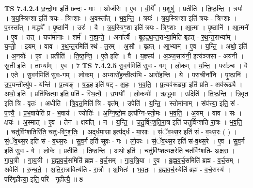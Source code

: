 \documentclass[17pt]{extarticle}
\begin{document}
                  \newline
                                \textbf{ TS 7.4.2.4} \newline
                  छ॒न्दो॒मा इति॑ छन्दः - माः । ओज॑सि । ए॒व । वी॒र्ये᳚ । प॒शुषु॑ । प्रतीति॑ । ति॒ष्ठ॒न्ति॒ । त्रयः॑ । त्र॒य॒स्त्रिꣳ॒॒शा इति॑ त्रयः - त्रिꣳ॒॒शाः । अ॒वस्ता᳚त् । भ॒व॒न्ति॒ । त्रयः॑ । त्र॒य॒स्त्रिꣳ॒॒शा इति॑ त्रयः - त्रिꣳ॒॒शाः । प॒रस्ता᳚त् । मद्ध्ये᳚ । पृ॒ष्ठानि॑ । उरः॑ । वै । त्र॒य॒स्त्रिꣳ॒॒शा इति॑ त्रयः - त्रिꣳ॒॒शाः । आ॒त्मा । पृ॒ष्ठानि॑ । आ॒त्मने᳚ । ए॒व । तत् । यज॑मानाः । शर्म॑ । न॒ह्य॒न्ते॒ । अना᳚र्त्यै । बृ॒ह॒द्र॒थ॒न्त॒राभ्या॒मिति॑ बृहत् - र॒थ॒न्त॒राभ्या᳚म् । य॒न्ती॒ । इ॒यम् । वाव । र॒थ॒न्त॒रमिति॑ रथं - त॒रम् । अ॒सौ । बृ॒हत् । आ॒भ्याम् । ए॒व । य॒न्ति॒ । अथो॒ इति॑ । अ॒नयोः᳚ । ए॒व । प्रतीति॑ । ति॒ष्ठ॒न्ति॒ । ए॒ते इति॑ । वै । य॒ज्ञ्स्य॑ । अ॒ञ्ज॒साय॑नी॒ इत्य॑ञ्जसा - अय॑नी । स्रु॒ती इति॑ । ताभ्या᳚म् । ए॒व । \textbf{  7} \newline
                  \newline
                                \textbf{ TS 7.4.2.5} \newline
                  सु॒व॒र्गमिति॑ सुवः - गम् । लो॒कम् । य॒न्ति॒ । परा᳚ञ्चः । वै । ए॒ते । सु॒व॒र्गमिति॑ सुवः-गम् । लो॒कम् । अ॒भ्यारो॑ह॒न्तीत्य॑भि - आरो॑हन्ति । ये । प॒रा॒चीना॑नि । पृ॒ष्ठानि॑ । उ॒प॒यन्तीत्यु॑प - यन्ति॑ । प्र॒त्यङ् । ष॒ड॒ह इति॑ षट् - अ॒हः । भ॒व॒ति॒ । प्र॒त्यव॑रूढ्या॒ इति॑ प्रति - अव॑रूढ्यै । अथो॒ इति॑ । प्रति॑ष्ठित्या॒ इति॒ प्रति॑ - स्थि॒त्यै॒ । उ॒भयोः᳚ । लो॒कयोः᳚ । ऋ॒द्ध्वा । उदिति॑ । ति॒ष्ठ॒न्ति॒ । त्रि॒वृत॒ इति॑ त्रि - वृतः॑ । अधीति॑ । त्रि॒वृत॒मिति॑ त्रि - वृत᳚म् । उपेति॑ । य॒न्ति॒ । स्तोमा॑नाम् । संप॑त्त्या॒ इति॒ सं - प॒त्त्यै॒ । प्र॒भ॒वायेति॑ प्र - भ॒वाय॑ । ज्योतिः॑ । अ॒ग्नि॒ष्टो॒म इत्य॑ग्नि-स्तो॒मः । भ॒व॒ति॒ । अ॒यम् । वाव । सः । क्षयः॑ । अ॒स्मात् । ए॒व । तेन॑ । क्षया᳚त् । न । य॒न्ति॒ । च॒तु॒र्विꣳ॒॒श॒ति॒रा॒त्र इति॑ चतुर्विꣳशति-रा॒त्रः । भ॒व॒ति॒ । चतु॑र्विꣳशति॒रिति॒ चतुः॑-विꣳ॒॒श॒तिः॒ । अ॒द्‌र्ध॒मा॒सा इत्य॑द्‌र्ध - मा॒साः । सं॒ॅव॒थ्स॒र इति॑ सं - व॒थ्स॒रः ( ) । सं॒ॅव॒थ्स॒र इति॑ सं - व॒थ्स॒रः । सु॒व॒र्ग इति॑ सुवः - गः । लो॒कः । सं॒ॅव॒थ्स॒र इति॑ सं-व॒थ्स॒रे । ए॒व । सु॒व॒र्ग इति॑ सुवः - गे । लो॒के । प्रतीति॑ । ति॒ष्ठ॒न्ति॒ । अथो॒ इति॑ । चतु॑र्विꣳशत्यक्ष॒रेति॒ चत॑र्विꣳशति- अ॒क्ष॒रा॒ । गा॒य॒त्री । गा॒य॒त्री । ब्र॒ह्म॒व॒र्च॒समिति॑ ब्रह्म - व॒र्च॒सम् । गा॒य॒त्रि॒या । ए॒व । ब्र॒ह्म॒व॒र्च॒समिति॑ ब्रह्म - व॒र्च॒सम् । अवेति॑ । रु॒न्ध॒ते॒ । अ॒ति॒रा॒त्रावित्य॑ति - रा॒त्रौ । अ॒भितः॑ । भ॒व॒तः॒ । ब्र॒ह्म॒व॒र्च॒स्येति॑ ब्रह्म - व॒र्च॒सस्य॑ । परि॑गृहीत्या॒ इति॒ परि॑ - गृ॒ही॒त्यै॒ ॥ \textbf{  8} \newline
                  \newline
\end{document}
